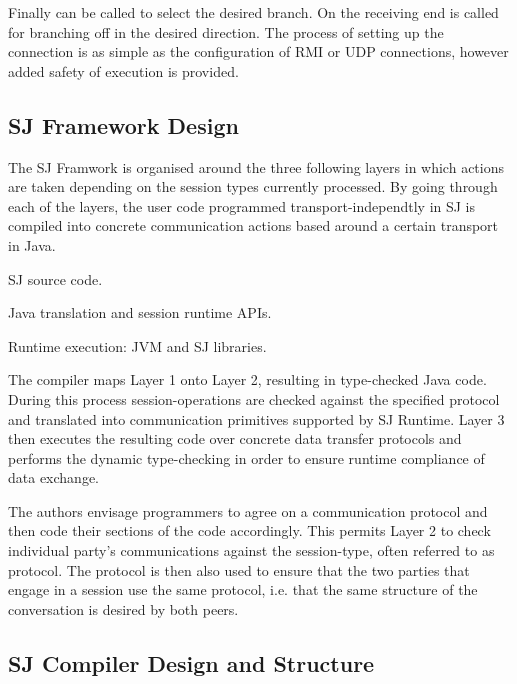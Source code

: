 Finally  can be called to select the desired branch. On the receiving end 
 is called for branching off in the desired direction. The process of setting up the connection is as simple as the configuration of RMI or UDP connections, however added safety of execution is provided.



\subsection{SJ Framework Design}
\label{subsec:sjdesign}

The SJ Framwork is organised around the three following layers in which actions are taken depending on the session types currently processed. By going through each of the layers, the user code programmed transport-independtly in SJ is compiled into concrete communication actions based around a certain transport in Java.

\begin{packed_description}
\item[Layer 1] SJ source code.
\item[Layer 2] Java translation and session runtime APIs.
\item[Layer 3] Runtime execution: JVM and SJ libraries.
\end{packed_description}

The compiler maps Layer 1 onto Layer 2, resulting in type-checked Java code. During this process session-operations are checked against the specified protocol and translated into communication primitives supported by SJ Runtime. Layer 3 then executes the resulting code over concrete data transfer protocols and performs the dynamic type-checking in order to ensure runtime compliance of data exchange.

The authors envisage programmers to agree on a communication protocol and then code their sections of the code accordingly. This permits Layer 2 to check individual party's communications against the session-type, often referred to as protocol. The protocol is then also used to ensure that the two parties that engage in a session use the same protocol, i.e. that the same structure of the conversation is desired by both peers.


\subsection{SJ Compiler Design and Structure}
\label{subsec:sjcomp} 

